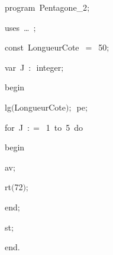 
{
\parindent {}
\medskip

\carrenoir
\vspace{\neglskip}\mbox{\blc  \idt  \mcl program\idt \ Pentagone\_2$;$
}\par 
\vspace{\neglskip}\mbox{\blc \blk\idt \mcl uses\idt \ \ldots\ $;$
}\par 
\pagebreak[3] 
\vspace{\neglskip}\mbox{\blc  \blk\idt  \mcl const\idt \ LongueurCote\ $=$\ 50$;$}\par 
\pagebreak[3] 
\vspace{\neglskip}\mbox{\blc  \blk\idt  \mcl var\idt \ J\ $:$\ integer$;$}\par 
\vspace{\neglskip}\mbox{\blc  \idt  \mcl begin\idt }\par 
\vspace{\neglskip}\mbox{\blc  \blk\idt  lg$($LongueurCote$)$$;$\ pe$;$}\par 
\pagebreak[3] 
\vspace{\neglskip}\mbox{\blc  \blk\idt  \mcl for\idt \ J\ $:$$=$\ 1\ \mcl to\idt \ 5\ \mcl do\idt }\par 
\vspace{\neglskip}\mbox{\blc  \blk\blk\idt  \mcl begin\idt }\par 
\vspace{\neglskip}\mbox{\blc  \blk\blk\blk\idt  av$;$}\par 
\vspace{\neglskip}\mbox{\blc  \blk\blk\blk\idt  rt$($72$)$$;$}\par 
\vspace{\neglskip}\mbox{\blc  \blk\blk\idt  \mcl end\idt $;$}\par 
\vspace{\neglskip}\mbox{\blc  \blk\idt  st$;$}\par 
\vspace{\neglskip}\mbox{\blc  \idt  \mcl end\idt $.$}\par 

\medskip }

